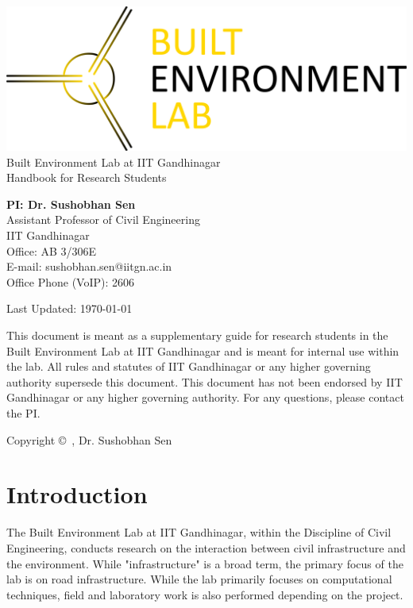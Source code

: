 \documentclass[12pt]{article}
\begin{document}
\begin{titlepage}
	\centering
	\includegraphics[scale=0.075]{BEL-logo.png} \\
	{\LARGE Built Environment Lab at IIT Gandhinagar \\
	\vspace{2cm}
	Handbook for Research Students}
	\vspace{2cm}
	
	\begin{large}	
	\textbf{PI: Dr. Sushobhan Sen} \\
	Assistant Professor of Civil Engineering \\
	IIT Gandhinagar \\
	Office: AB 3/306E \\
	E-mail: sushobhan.sen@iitgn.ac.in \\
	Office Phone (VoIP): 2606

	\vspace{2cm}
	\end{large}
	
	Last Updated: \today
\end{titlepage}

This document is meant as a supplementary guide for research students in the Built Environment Lab at IIT Gandhinagar and is meant for internal use within the lab. All rules and statutes of IIT Gandhinagar or any higher governing authority supersede this document. This document has not been endorsed by IIT Gandhinagar or any higher governing authority. For any questions, please contact the PI.

\doclicenseThis

Copyright \copyright\ \the\year{}, Dr. Sushobhan Sen
\newpage

\tableofcontents
\newpage

\section{Introduction}
The Built Environment Lab at IIT Gandhinagar, within the Discipline of Civil Engineering, conducts research on the interaction between civil infrastructure and the environment. While "infrastructure" is a broad term, the primary focus of the lab is on road infrastructure. While the lab primarily focuses on computational techniques, field and laboratory work is also performed depending on the project. 
\end{document}
